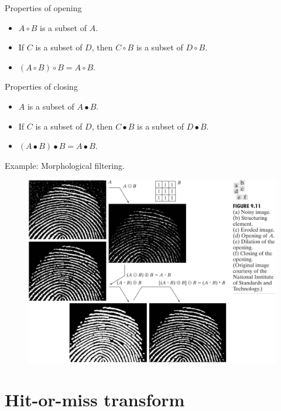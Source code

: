 \begin{frame}
\begin{block}{Properties of opening}
\begin{itemize}
\item $A \circ B$ is a subset of $A$.
\item If $C$ is a subset of $D$, then $C \circ B$ is a subset of $D \circ B$.
\item $\left ( A \circ B \right ) \circ B = A \circ B $.
\end{itemize}
\end{block}
\begin{block}{Properties of closing}
\begin{itemize}
\item $A$ is a subset of $A \bullet B$.
\item If $C$ is a subset of $D$, then $C\bullet B$ is a subset of $D \bullet B$.
\item $ \left ( A\bullet B\right ) \bullet	B = A\bullet B $.
\end{itemize}
\end{block}
\end{frame}

\begin{frame}
Example: Morphological filtering.
\begin{figure}[!h]
\includegraphics[width=.7\textwidth]{fig-9-11.png}
\end{figure}
\end{frame}

\section{Hit-or-miss transform}

